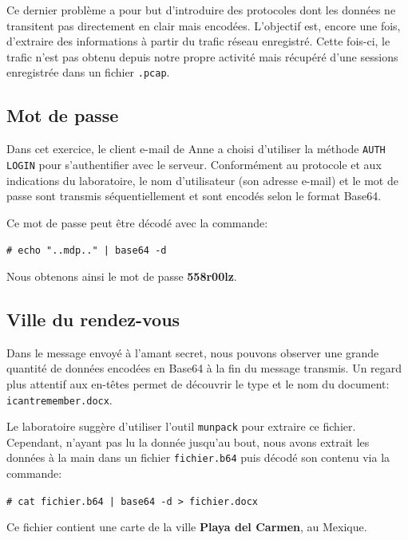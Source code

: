 \documentclass[11pt,a4paper]{article}
\newcommand{\shellcmd}[1]{\texttt{\footnotesize\# #1}}
\begin{document}
Ce dernier problème a pour but d'introduire des protocoles dont les données ne transitent pas directement en clair mais encodées. L'objectif est, encore une fois, d'extraire des informations à partir du trafic réseau enregistré. Cette fois-ci, le trafic n'est pas obtenu depuis notre propre activité mais récupéré d'une sessions enregistrée dans un fichier \texttt{.pcap}.

\subsection{Mot de passe}

Dans cet exercice, le client e-mail de Anne a choisi d'utiliser la méthode \texttt{AUTH LOGIN} pour s'authentifier avec le serveur. Conformément au protocole et aux indications du laboratoire, le nom d'utilisateur (son adresse e-mail) et le mot de passe sont transmis séquentiellement et sont encodés selon le format Base64.

Ce mot de passe peut être décodé avec la commande:

\shellcmd{echo "..mdp.." | base64 -d}

Nous obtenons ainsi le mot de passe \textbf{558r00lz}.

\subsection{Ville du rendez-vous}

Dans le message envoyé à l'amant secret, nous pouvons observer une grande quantité de données encodées en Base64 à la fin du message transmis. Un regard plus attentif aux en-têtes permet de découvrir le type et le nom du document: \texttt{icantremember.docx}.

Le laboratoire suggère d'utiliser l'outil \texttt{munpack} pour extraire ce fichier. Cependant, n'ayant pas lu la donnée jusqu'au bout, nous avons extrait les données à la main dans un fichier \texttt{fichier.b64} puis décodé son contenu via la commande:

\shellcmd{cat fichier.b64 | base64 -d > fichier.docx}

Ce fichier contient une carte de la ville \textbf{Playa del Carmen}, au Mexique.
\end{document}
